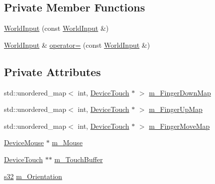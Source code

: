 \subsection*{Private Member Functions}
\begin{DoxyCompactItemize}
\item 
\mbox{\hyperlink{classnjli_1_1_world_input_a246e576e4b9214d96493fbb7ffd51455}{World\+Input}} (const \mbox{\hyperlink{classnjli_1_1_world_input}{World\+Input}} \&)
\item 
\mbox{\hyperlink{classnjli_1_1_world_input}{World\+Input}} \& \mbox{\hyperlink{classnjli_1_1_world_input_a2264836ad331a16cd3a729f3979020fb}{operator=}} (const \mbox{\hyperlink{classnjli_1_1_world_input}{World\+Input}} \&)
\end{DoxyCompactItemize}
\subsection*{Private Attributes}
\begin{DoxyCompactItemize}
\item 
std\+::unordered\+\_\+map$<$ int, \mbox{\hyperlink{classnjli_1_1_device_touch}{Device\+Touch}} $\ast$ $>$ \mbox{\hyperlink{classnjli_1_1_world_input_ab84a5dd501740fc57be6241b4f3f0167}{m\+\_\+\+Finger\+Down\+Map}}
\item 
std\+::unordered\+\_\+map$<$ int, \mbox{\hyperlink{classnjli_1_1_device_touch}{Device\+Touch}} $\ast$ $>$ \mbox{\hyperlink{classnjli_1_1_world_input_ac561e0ce2eda4b5a85599f93103b3094}{m\+\_\+\+Finger\+Up\+Map}}
\item 
std\+::unordered\+\_\+map$<$ int, \mbox{\hyperlink{classnjli_1_1_device_touch}{Device\+Touch}} $\ast$ $>$ \mbox{\hyperlink{classnjli_1_1_world_input_a10c8c7d66c9c87244aa93b058b91b748}{m\+\_\+\+Finger\+Move\+Map}}
\item 
\mbox{\hyperlink{classnjli_1_1_device_mouse}{Device\+Mouse}} $\ast$ \mbox{\hyperlink{classnjli_1_1_world_input_a874f516fde66adeb88ed1af5f5d480ed}{m\+\_\+\+Mouse}}
\item 
\mbox{\hyperlink{classnjli_1_1_device_touch}{Device\+Touch}} $\ast$$\ast$ \mbox{\hyperlink{classnjli_1_1_world_input_a51dd3d566354398abd60c94fa040e208}{m\+\_\+\+Touch\+Buffer}}
\item 
\mbox{\hyperlink{_util_8h_aa62c75d314a0d1f37f79c4b73b2292e2}{s32}} \mbox{\hyperlink{classnjli_1_1_world_input_ae4e2eea7b14113c53cab85a63d44b985}{m\+\_\+\+Orientation}}
\end{DoxyCompactItemize}


